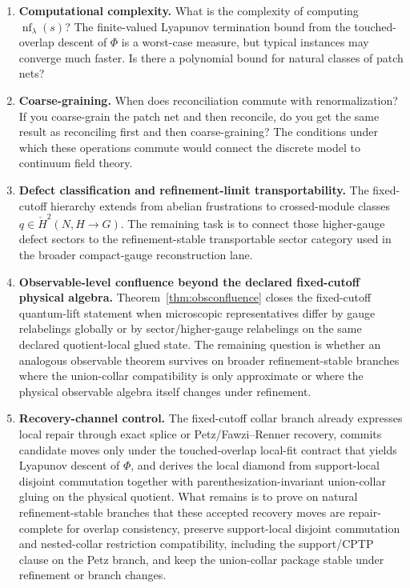 \documentclass[11pt]{article}
\theoremstyle{remark}
\theoremstyle{plain}
\begin{document}
\begin{enumerate}
\item \textbf{Computational complexity.} What is the complexity of computing $\operatorname{nf}_\lambda(s)$? The finite-valued Lyapunov termination bound from the touched-overlap descent of \(\Phi\) is a worst-case measure, but typical instances may converge much faster. Is there a polynomial bound for natural classes of patch nets?

\item \textbf{Coarse-graining.} When does reconciliation commute with renormalization? If you coarse-grain the patch net and then reconcile, do you get the same result as reconciling first and then coarse-graining? The conditions under which these operations commute would connect the discrete model to continuum field theory.

\item \textbf{Defect classification and refinement-limit transportability.} The fixed-cutoff hierarchy extends from abelian frustrations to crossed-module classes \(q\in \check H^2(N,H\to G)\). The remaining task is to connect those higher-gauge defect sectors to the refinement-stable transportable sector category used in the broader compact-gauge reconstruction lane.

\item \textbf{Observable-level confluence beyond the declared fixed-cutoff physical algebra.} Theorem~\ref{thm:obsconfluence} closes the fixed-cutoff quantum-lift statement when microscopic representatives differ by gauge relabelings globally or by sector/higher-gauge relabelings on the same declared quotient-local glued state. The remaining question is whether an analogous observable theorem survives on broader refinement-stable branches where the union-collar compatibility is only approximate or where the physical observable algebra itself changes under refinement.

\item \textbf{Recovery-channel control.} The fixed-cutoff collar branch already expresses local repair through exact splice or Petz/Fawzi--Renner recovery, commits candidate moves only under the touched-overlap local-fit contract that yields Lyapunov descent of \(\Phi\), and derives the local diamond from support-local disjoint commutation together with parenthesization-invariant union-collar gluing on the physical quotient. What remains is to prove on natural refinement-stable branches that these accepted recovery moves are repair-complete for overlap consistency, preserve support-local disjoint commutation and nested-collar restriction compatibility, including the support/CPTP clause on the Petz branch, and keep the union-collar package stable under refinement or branch changes.


\end{enumerate}
\end{document}
